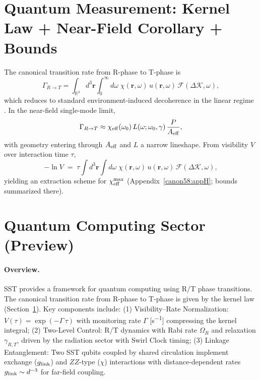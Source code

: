 \documentclass[10pt,reprint,aps,onecolumn,nofootinbib]{revtex4-2}
\begin{document}
    \section{Quantum Measurement: Kernel Law + Near-Field Corollary + Bounds}\label{canon58:measurement}
        The canonical transition rate from R-phase to T-phase is
        \begin{equation}
            \Gamma_{R\to T}
            =\int_{\mathbb{R}^3}\! d^3\mathbf r \int_{0}^{\infty}\! d\omega\;
            \chi(\mathbf r,\omega)\,u(\mathbf r,\omega)\,\mathcal F(\Delta\mathcal K,\omega),
            \label{eq:kernel}
        \end{equation}
        which reduces to standard environment-induced decoherence in the linear regime \cite{Zurek2003}.
        In the near-field single-mode limit,
        \[
            \Gamma_{R\to T}\approx \chi_{\rm eff}(\omega_0)\,L(\omega;\omega_0,\gamma)\,\frac{P}{A_{\rm eff}},
        \]
        with geometry entering through $A_{\rm eff}$ and $L$ a narrow lineshape. From visibility $V$ over interaction time $\tau$,
        \[
            -\ln V \;=\; \tau \int d^3\mathbf r \int d\omega\;\chi(\mathbf r,\omega)\,u(\mathbf r,\omega)\,\mathcal F(\Delta\mathcal K,\omega),
        \]
        yielding an extraction scheme for $\chi_{\rm eff}^{\max}$ (Appendix~\ref{canon58:appH}; bounds summarized there). %


    \section{Quantum Computing Sector (Preview)}
        \label{sec:quantum-computing-preview}

        \paragraph{Overview.}
            SST provides a framework for quantum computing using R/T phase transitions. The canonical transition rate from R-phase to T-phase is given by the kernel law (Section~\ref{canon58:measurement}). Key components include: (1) Visibility–Rate Normalization: $V(\tau)=\exp(-\Gamma\,\tau)$ with monitoring rate $\Gamma$ [\si{s^{-1}}] compressing the kernel integral; (2) Two-Level Control: R/T dynamics with Rabi rate $\Omega_R$ and relaxation $\gamma_{R,T}$, driven by the radiation sector with Swirl Clock timing; (3) Linkage Entanglement: Two SST qubits coupled by shared circulation implement exchange ($g_{\rm link}$) and $ZZ$-type ($\chi$) interactions with distance-dependent rates $g_{\rm link}\sim d^{-3}$ for far-field coupling.
\end{document}
